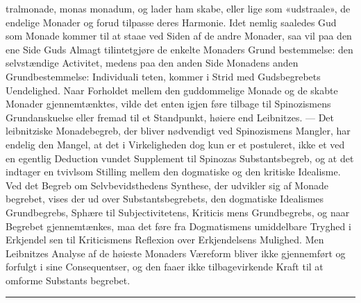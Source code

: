 \documentclass[12pt,a4paper]{book}
\newcommand{\divrule}{\begin{center}\rule{2cm}{0.4pt}\end{center}}
\begin{document}
tralmonade, monas monadum, og lader ham skabe, eller lige\-%
som «udstraale», de endelige Monader og forud tilpasse deres
Harmonie. Idet nemlig saaledes Gud som Monade kommer
til at staae ved Siden af de andre Monader, saa vil paa den
ene Side Guds Almagt tilintetgjøre de enkelte Monaders Grund\-%
bestemmelse: den selvstændige Activitet, medens paa den
anden Side Monadens anden Grundbestemmelse: Individuali\-%
teten, kommer i Strid med Gudsbegrebets Uendelighed. Naar
Forholdet mellem den guddommelige Monade og de skabte
Monader gjennemtænktes, vilde det enten igjen føre tilbage til
Spinozismens Grundanskuelse eller fremad til et Standpunkt,
høiere end Leibnitzes. --- Det leibnitziske Monadebegreb, der
bliver nødvendigt ved Spinozismens Mangler, har endelig den
Mangel, at det i Virkeligheden dog kun er et postuleret, ikke
et ved en egentlig Deduction vundet Supplement til Spinozas
Substantsbegreb, og at det indtager en tvivlsom Stilling mellem
den dogmatiske og den kritiske Idealisme. Ved det Begreb
om Selvbevidsthedens Synthese, der udvikler sig af Monade\-%
begrebet, vises der ud over Substantsbegrebets, den dogmatiske
Idealismes Grundbegrebs, Sphære til Subjectivitetens, Kriticis\-%
mens Grundbegrebs, og naar Begrebet gjennemtænkes, maa
det føre fra Dogmatismens umiddelbare Tryghed i Erkjendel\-%
sen til Kriticismens Reflexion over Erkjendelsens Mulighed.
Men Leibnitzes Analyse af de høieste Monaders Væreform
bliver ikke gjennemført og forfulgt i sine Consequentser, og
den faaer ikke tilbagevirkende Kraft til at omforme Substants\-%
begrebet.

\divrule
\end{document}
